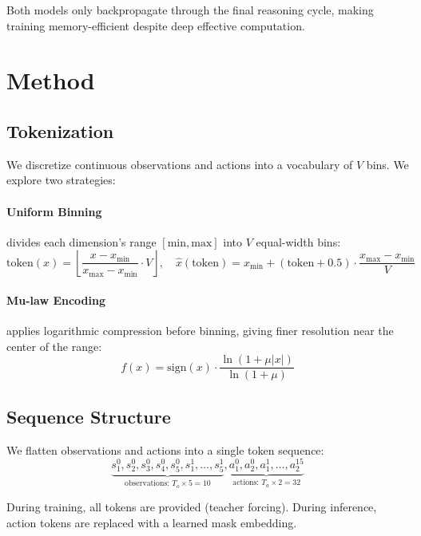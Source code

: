 \documentclass[11pt,a4paper]{article}
\begin{document}
Both models only backpropagate through the final reasoning cycle, making training memory-efficient despite deep effective computation.

\section{Method}

\subsection{Tokenization}

We discretize continuous observations and actions into a vocabulary of $V$ bins. We explore two strategies:

\paragraph{Uniform Binning} divides each dimension's range $[\text{min}, \text{max}]$ into $V$ equal-width bins:
\begin{equation}
    \text{token}(x) = \left\lfloor \frac{x - x_{\min}}{x_{\max} - x_{\min}} \cdot V \right\rfloor, \quad
    \hat{x}(\text{token}) = x_{\min} + \left(\text{token} + 0.5\right) \cdot \frac{x_{\max} - x_{\min}}{V}
\end{equation}

\paragraph{Mu-law Encoding} applies logarithmic compression before binning, giving finer resolution near the center of the range:
\begin{equation}
    f(x) = \text{sign}(x) \cdot \frac{\ln(1 + \mu |x|)}{\ln(1 + \mu)}
\end{equation}

\subsection{Sequence Structure}

We flatten observations and actions into a single token sequence:
\[
    \underbrace{s^0_1, s^0_2, s^0_3, s^0_4, s^0_5, s^1_1, \ldots, s^1_5}_{\text{observations: } T_o \times 5 = 10},
    \underbrace{a^0_1, a^0_2, a^1_1, \ldots, a^{15}_2}_{\text{actions: } T_a \times 2 = 32}
\]

During training, all tokens are provided (teacher forcing). During inference, action tokens are replaced with a learned mask embedding.
\end{document}
